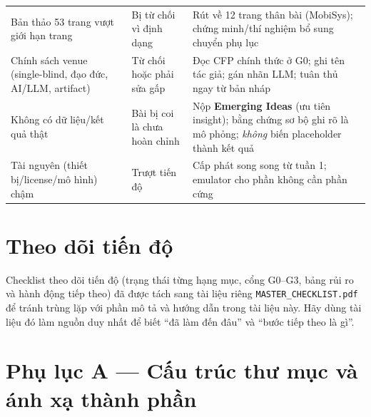 \documentclass[11pt,a4paper]{article}
\newcommand{\code}[1]{\texttt{\small #1}}
\begin{document}
\begin{longtable}{@{}p{4.1cm}p{4.9cm}p{6.0cm}@{}}
Bản thảo 53 trang vượt giới hạn trang & Bị từ chối vì định dạng & Rút về 12 trang thân bài (MobiSys); chứng minh/thí nghiệm bổ sung chuyển phụ lục \\
Chính sách venue (single-blind, đạo đức, AI/LLM, artifact) & Từ chối hoặc phải sửa gấp & Đọc CFP chính thức ở G0; ghi tên tác giả; gán nhãn LLM; tuân thủ ngay từ bản nháp \\
Không có dữ liệu/kết quả thật & Bài bị coi là chưa hoàn chỉnh & Nộp \textbf{Emerging Ideas} (ưu tiên insight); bằng chứng sơ bộ ghi rõ là mô phỏng; \emph{không} biến placeholder thành kết quả \\
Tài nguyên (thiết bị/license/mô hình) chậm & Trượt tiến độ & Cấp phát song song từ tuần 1; emulator cho phần không cần phần cứng \\
\bottomrule
\end{longtable}

\section{Theo dõi tiến độ}

Checklist theo dõi tiến độ (trạng thái từng hạng mục, cổng G0--G3, bảng rủi ro và hành động tiếp theo) đã được tách sang tài liệu riêng \code{MASTER\_CHECKLIST.pdf} để tránh trùng lặp với phần mô tả và hướng dẫn trong tài liệu này. Hãy dùng tài liệu đó làm nguồn duy nhất để biết ``đã làm đến đâu'' và ``bước tiếp theo là gì''.

\section{Phụ lục A --- Cấu trúc thư mục và ánh xạ thành phần}
\end{document}
